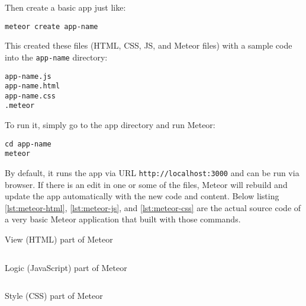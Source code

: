 \noindent Then create a basic app just like:

\begin{verbatim}
meteor create app-name
\end{verbatim}

This created these files (\ac{HTML}, \ac{CSS}, \ac{JS}, and Meteor files) with a sample code into the \verb|app-name| directory:

\begin{verbatim}
app-name.js
app-name.html
app-name.css
.meteor
\end{verbatim}

To run it, simply go to the app directory and run Meteor:

\begin{verbatim}
cd app-name
meteor
\end{verbatim}

By default, it runs the app via \ac{URL} \verb|http://localhost:3000| and can be run via browser.
If there is an edit in one or some of the files, Meteor will rebuild and update the app automatically with the new code and content.
\noindent Below listing \autoref{lst:meteor-html}, \autoref{lst:meteor-js}, and \autoref{lst:meteor-css} are the actual source code of a very basic Meteor application that built with those commands.

\begin{listing}[!hp]
\caption{View (HTML) part of Meteor}
\inputminted{html}{\dir/include/meteor/meteor.html}
\label{lst:meteor-html}
\end{listing}

\begin{listing}[!hp]
\caption{Logic (JavaScript) part of Meteor}
\inputminted{javascript}{\dir/include/meteor/meteor.js}
\label{lst:meteor-js}
\end{listing}

\begin{listing}[!hp]
\caption{Style (CSS) part of Meteor}
\inputminted{css}{\dir/include/meteor/meteor.css}
\label{lst:meteor-css}
\end{listing}
